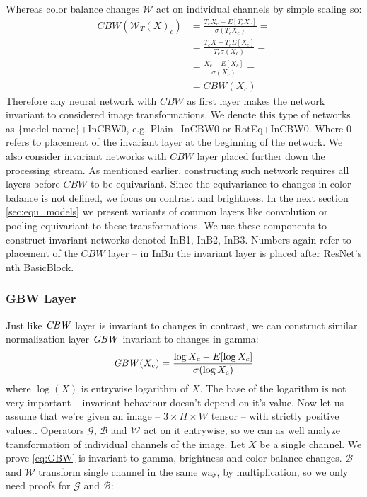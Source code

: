 Whereas color balance changes $\mathcal{W}$ act on individual channels by simple
scaling so:
\begin{align*}
    \mathit{CBW}(\mathcal{W}_T(X)_c) &=
    \frac{T_cX_c - E\left[T_cX_c\right]}{\sigma(T_cX_c)} = \\
    &= \frac{T_cX-T_cE[X_c]}{T_c\sigma(X_c)} = \\
    &= \frac{X_c-E[X_c]}{\sigma(X_c)} = \\
    &= \mathit{CBW}(X_c)
\end{align*}
Therefore any neural network with $\mathit{CBW}$ as first layer
makes the network invariant to considered image transformations.
We denote this type of networks as \{model-name\}+InCBW0, e.g. Plain+InCBW0 or
RotEq+InCBW0. Where 0 refers to placement of the invariant layer at the
beginning of the network. We also consider invariant networks with $\mathit{CBW}$
layer placed further down the processing stream. As mentioned earlier,
constructing such network requires all layers before $\mathit{CBW}$ to be
equivariant. Since the equivariance to changes in color balance is not defined,
we focus on contrast and brightness. In the next section \ref{sec:equ_models} we
present variants of common layers like convolution or pooling equivariant to
these transformations. We use these components to construct invariant networks
denoted InB1, InB2, InB3. Numbers again refer to
placement of the $\mathit{CBW}$ layer -- in InBn the invariant layer is placed
after ResNet's nth BasicBlock.

\subsubsection{GBW Layer}
Just like $\mathit{CBW}$ layer is invariant to changes in contrast,
we can construct similar normalization layer $\mathit{GBW}$ invariant to changes in
gamma:
\begin{equation}
    \mathit{GBW}(X_c) = \frac{\log{X_c}-E[\log{X_c}]}{\sigma(\log{X_c})}
    \label{eq:GBW}
\end{equation}
where $\log(X)$ is entrywise logarithm of $X$. The base of the
logarithm is not very important -- invariant behaviour doesn't depend on it's value.
Now let us assume that we're given an image -- $3\times H \times W$ tensor --
with strictly positive values..
Operators $\mathcal{G}$, $\mathcal{B}$ and $\mathcal{W}$ act on it entrywise, so
we can as well analyze transformation of individual channels of the image.
Let $X$ be a single channel.
We prove \ref{eq:GBW} is invariant to gamma, brightness and color balance
changes. $\mathcal{B}$ and $\mathcal{W}$ transform single channel in the same
way, by multiplication,
so we only need proofs for $\mathcal{G}$ and $\mathcal{B}$:

